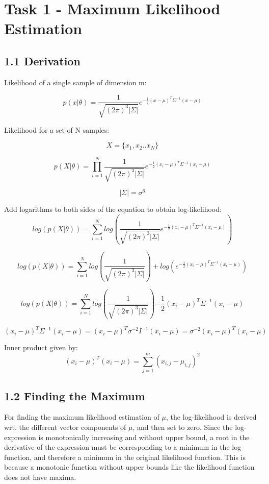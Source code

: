 
\section{Task 1 - Maximum Likelihood Estimation}



\subsection*{1.1 Derivation}

Likelihood of a single sample of dimension m:

$$
p(x|\theta) = \frac{1}{\sqrt{(2 \pi )^3 \vert \Sigma \vert}} e^{-\frac{1}{2} (x-\mu )^T \Sigma ^{-1} (x-\mu)}
$$

Likelihood for a set of N samples:

$$
X = \{x_1, x_2 .. x_N\}
$$


$$
p(X|\theta) = \prod_{i=1}^{N} \frac{1}{\sqrt{(2 \pi )^3 \vert \Sigma \vert}} e^{-\frac{1}{2} (x_i-\mu )^T \Sigma ^{-1} (x_i-\mu)}
$$



$$
\vert \Sigma \vert = \sigma^6
$$


Add logarithms to both sides of the equation to obtain log-likelihood:
$$
log(p(X|\theta)) = \sum_{i=1}^{N}log(\frac{1}{\sqrt{(2 \pi )^3 \vert \Sigma \vert}} e^{-\frac{1}{2} (x_i-\mu )^T \Sigma ^{-1} (x_i-\mu)})
$$

$$
log(p(X|\theta)) = \sum_{i=1}^{N} log(\frac{1}{\sqrt{(2 \pi )^3 \vert \Sigma \vert}}) + log( e^{-\frac{1}{2} (x_i-\mu )^T \Sigma ^{-1} (x_i-\mu)})
$$

$$
log(p(X|\theta)) = \sum_{i=1}^{N} log(\frac{1}{\sqrt{(2 \pi )^3 \vert \Sigma \vert}})  {-\frac{1}{2} (x_i-\mu )^T \Sigma ^{-1} (x_i-\mu)}
$$





$$
(x_i-\mu )^T \Sigma ^{-1} (x_i-\mu) = (x_i-\mu )^T \sigma^{-2} I ^{-1} (x_i-\mu) = \sigma^{-2} (x_i-\mu )^T (x_i-\mu)
$$


Inner product given by:
$$
(x_i-\mu )^T  (x_i-\mu) = \sum_{j=1}^{m} (x_{i,j} - \mu_{i,j})^2
$$

\subsection*{1.2 Finding the Maximum}

For finding the maximum likelihood estimation of $\mu$, the log-likelihood is derived wrt. the different vector components of $\mu$, and then set to zero. Since the log-expression is monotonically increasing and without upper bound, a root in the derivative of the expression must be corresponding to a minimum in the log function, and therefore a minimum in the original likelihood function. This is because a monotonic function without upper bounds like the likelihood function does not have maxima.

